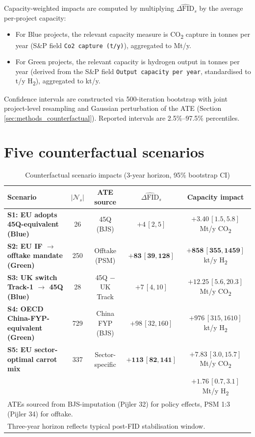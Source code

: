 Capacity-weighted impacts are computed by multiplying $\widehat{\Delta\text{FID}}_s$ by the average per-project capacity:
\begin{itemize}[leftmargin=2em]
\item For Blue projects, the relevant capacity measure is CO\textsubscript{2} capture in tonnes per year (S\&P field \texttt{Co2 capture (t/y)}), aggregated to Mt/y.
\item For Green projects, the relevant capacity is hydrogen output in tonnes per year (derived from the S\&P field \texttt{Output capacity per year}, standardised to t/y H\textsubscript{2}), aggregated to kt/y.
\end{itemize}

Confidence intervals are constructed via 500-iteration bootstrap with joint project-level resampling and Gaussian perturbation of the ATE (Section \ref{sec:methods_counterfactual}). Reported intervals are 2.5\%--97.5\% percentiles.

\section{Five counterfactual scenarios}
\label{sec:counterfactual_results}

\begin{table}[h]
\centering
\caption{Counterfactual scenario impacts (3-year horizon, 95\% bootstrap CI)}
\label{tab:counterfactual_main}
\small
\begin{tabular}{p{6cm}cccc}
\toprule
Scenario & $|\mathcal{N}_s|$ & ATE source & $\widehat{\Delta\text{FID}}_s$ & Capacity impact \\
\midrule
\textbf{S1: EU adopts 45Q-equivalent (Blue)} & 26 & 45Q (BJS) & $+4\,[2, 5]$ & $+3.40\,[1.5, 5.8]$ Mt/y CO\textsubscript{2} \\
\textbf{S2: EU IF $\to$ offtake mandate (Green)} & 250 & Offtake (PSM) & $\mathbf{+83\,[39, 128]}$ & $\mathbf{+858\,[355, 1459]}$ kt/y H\textsubscript{2} \\
\textbf{S3: UK switch Track-1 $\to$ 45Q (Blue)} & 28 & 45Q $-$ UK Track & $+7\,[4, 10]$ & $+12.25\,[5.6, 20.3]$ Mt/y CO\textsubscript{2} \\
\textbf{S4: OECD China-FYP-equivalent (Green)} & 729 & China FYP (BJS) & $+98\,[32, 160]$ & $+976\,[315, 1610]$ kt/y H\textsubscript{2} \\
\textbf{S5: EU sector-optimal carrot mix} & 337 & Sector-specific & $\mathbf{+113\,[82, 141]}$ & $\mathbf{+7.83\,[3.0, 15.7]}$ Mt/y CO\textsubscript{2} \\
                                              &     &           &                & $+1.76\,[0.7, 3.1]$ Mt/y H\textsubscript{2} \\
\bottomrule
\multicolumn{5}{l}{\footnotesize ATEs sourced from BJS-imputation (Pijler 32) for policy effects, PSM 1:3 (Pijler 34) for offtake.} \\
\multicolumn{5}{l}{\footnotesize Three-year horizon reflects typical post-FID stabilisation window.} \\
\end{tabular}
\end{table}

